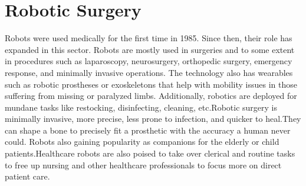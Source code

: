 \documentclass{article}[A4,12pt]
\begin{document}
\section{Robotic Surgery}
Robots were used medically for the first time in 1985. Since then, their role has expanded in this sector. Robots are mostly used in surgeries and to some extent in procedures such as laparoscopy, neurosurgery, orthopedic surgery, emergency response, and minimally invasive operations. The technology also has wearables such as robotic prostheses or exoskeletons that help with mobility issues in those suffering from missing or paralyzed limbs. Additionally, robotics are deployed for mundane tasks like restocking, disinfecting, cleaning, etc.Robotic surgery is minimally invasive, more precise, less prone to infection, and quicker to heal.They can shape a bone to precisely fit a prosthetic with the accuracy a human never could. Robots also gaining popularity as companions for the elderly or child patients.Healthcare robots are also poised to take over clerical and routine tasks to free up nursing and other healthcare professionals to focus more on direct patient care.
\end{document}
